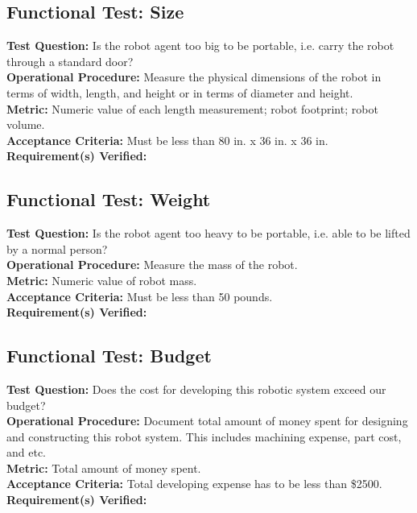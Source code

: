 \subsection{Functional Test: Size}
\label{test:sys_ft_size}
\textbf{Test Question:} Is the robot agent too big to be portable, i.e. carry the robot through a standard door?\\
\textbf{Operational Procedure:} Measure the physical dimensions of the robot in terms of width, length, and height or in terms of diameter and height. \\
\textbf{Metric:} Numeric value of each length measurement; robot footprint; robot volume.\\
\textbf{Acceptance Criteria:} Must be less than 80 in. x 36 in. x 36 in. \\
\textbf{Requirement(s) Verified:} 

\subsection{Functional Test: Weight}
\label{test:sys_ft_weight}
\textbf{Test Question:} Is the robot agent too heavy to be portable, i.e. able to be lifted by a normal person?\\
\textbf{Operational Procedure:} Measure the mass of the robot. \\
\textbf{Metric:} Numeric value of robot mass.\\
\textbf{Acceptance Criteria:} Must be less than 50 pounds. \\
\textbf{Requirement(s) Verified:} 

\subsection{Functional Test: Budget}
\label{test:sys_ft_budget}
\textbf{Test Question:} Does the cost for developing this robotic system exceed our budget?\\
\textbf{Operational Procedure:} Document total amount of money spent for designing and constructing this robot system. This includes machining expense, part cost, and etc. \\
\textbf{Metric:} Total amount of money spent.\\
\textbf{Acceptance Criteria:} Total developing expense has to be less than \$2500. \\
\textbf{Requirement(s) Verified:} 

